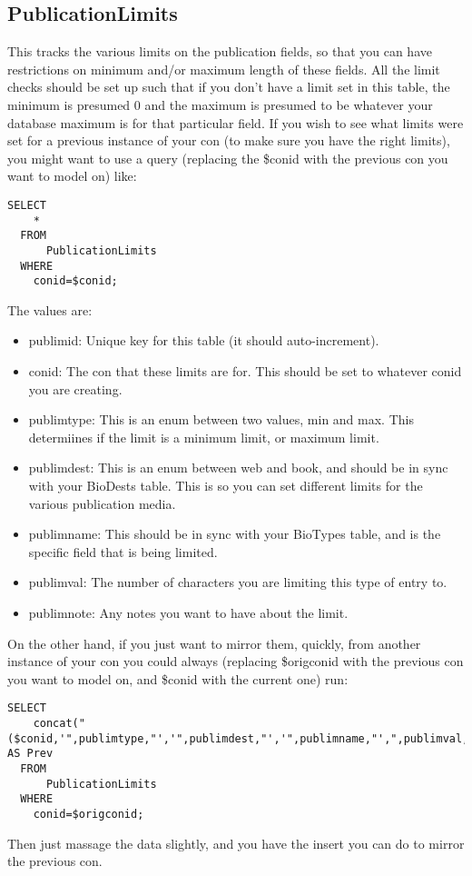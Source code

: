 \documentclass[captions=tablesignature]{scrartcl}
\begin{document}
\subsection{PublicationLimits}
\label{sec-13-1}
This tracks the various limits on the publication fields, so that
you can have restrictions on minimum and/or maximum length of these
fields.  All the limit checks should be set up such that if you
don't have a limit set in this table, the minimum is presumed 0 and
the maximum is presumed to be whatever your database maximum is for
that particular field.  If you wish to see what limits were set for
a previous instance of your con (to make sure you have the right
limits), you might want to use a query (replacing the \$conid with
the previous con you want to model on) like:
\begin{verbatim}
SELECT
    *
  FROM
      PublicationLimits
  WHERE
    conid=$conid;
\end{verbatim}
The values are:
\begin{itemize}
\item publimid: Unique key for this table (it should auto-increment).
\item conid: The con that these limits are for.  This should be set to
whatever conid you are creating.
\item publimtype: This is an enum between two values, min and max.
This determiines if the limit is a minimum limit, or maximum
limit.
\item publimdest: This is an enum between web and book, and should be
in sync with your BioDests table.  This is so you can set
different limits for the various publication media.
\item publimname: This should be in sync with your BioTypes table, and
is the specific field that is being limited.
\item publimval: The number of characters you are limiting this type of
entry to.
\item publimnote: Any notes you want to have about the limit.
\end{itemize}

On the other hand, if you just want to mirror them, quickly, from
another instance of your con you could always (replacing \$origconid
with the previous con you want to model on, and \$conid with the
current one) run:
\begin{verbatim}
SELECT
    concat("($conid,'",publimtype,"','",publimdest,"','",publimname,"',",publimval,",'",publimnote,"'),") AS Prev
  FROM
      PublicationLimits
  WHERE
    conid=$origconid;
\end{verbatim}
Then just massage the data slightly, and you have the insert you
can do to mirror the previous con.
\end{document}
